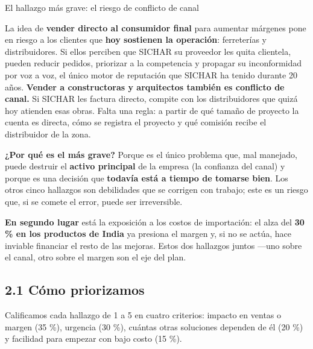 \documentclass[11pt,a4paper]{article}
\begin{document}
\begin{cajaalerta}{El hallazgo más grave: el riesgo de conflicto de canal}

La idea de \textbf{vender directo al consumidor final} para aumentar márgenes pone en riesgo a los
clientes que \textbf{hoy sostienen la operación}: ferreterías y distribuidores. Si ellos perciben
que SICHAR su proveedor les quita clientela, pueden reducir pedidos, priorizar a la competencia y
propagar su inconformidad por voz a voz, el único motor de reputación que SICHAR ha tenido durante
20 años. \textbf{Vender a constructoras y arquitectos también es conflicto de canal.} Si SICHAR les
factura directo, compite con los distribuidores que quizá hoy atienden esas obras. Falta una regla:
a partir de qué tamaño de proyecto la cuenta es directa, cómo se registra el proyecto y qué comisión
recibe el distribuidor de la zona.

\end{cajaalerta}

\textbf{¿Por qué es el más grave?} Porque es el único problema que, mal manejado, puede destruir el
\textbf{activo principal} de la empresa (la confianza del canal) y porque es una decisión que
\textbf{todavía está a tiempo de tomarse bien}. Los otros cinco hallazgos son debilidades que se
corrigen con trabajo; este es un riesgo que, si se comete el error, puede ser irreversible.

\textbf{En segundo lugar} está la exposición a los costos de importación: el alza del \textbf{30 \%
en los productos de India} ya presiona el margen y, si no se actúa, hace inviable financiar el resto
de las mejoras. Estos dos hallazgos juntos ---uno sobre el canal, otro sobre el margen son el eje
del plan.


\subsection{2.1 Cómo priorizamos}

Calificamos cada hallazgo de 1 a 5 en cuatro criterios: impacto en ventas o margen (35 \%), urgencia
(30 \%), cuántas otras soluciones dependen de él (20 \%) y facilidad para empezar con bajo costo (15
\%).
\end{document}
